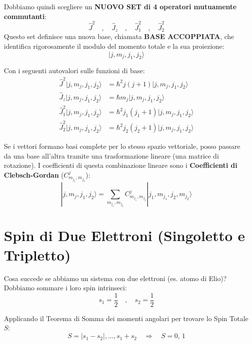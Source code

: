 \documentclass[11pt, a4paper]{article}
\begin{document}
\noindent
Dobbiamo quindi scegliere un \textbf{NUOVO SET di 4 operatori mutuamente commutanti}: %
\begin{equation*}
    \hat{J}^2 \quad , \quad \hat{J}_z \quad , \quad \hat{J}_1^2 \quad , \quad \hat{J}_2^2 %
\end{equation*}
Questo set definisce una nuova base, chiamata \textbf{BASE ACCOPPIATA}, che identifica rigorosamente il modulo del momento totale e la sua proiezione: %
\begin{equation}
    \boxed{ |j, m_j, j_1, j_2\rangle } %
\end{equation}

Con i seguenti autovalori sulle funzioni di base: %
\begin{align*}
    \hat{J}^2 |j, m_j, j_1, j_2\rangle &= \hbar^2 j(j+1) |j, m_j, j_1, j_2\rangle \\ %
    \hat{J}_z |j, m_j, j_1, j_2\rangle &= \hbar m_j |j, m_j, j_1, j_2\rangle \\ %
    \hat{J}_1^2 |j, m_j, j_1, j_2\rangle &= \hbar^2 j_1(j_1+1) |j, m_j, j_1, j_2\rangle \\ %
    \hat{J}_2^2 |j, m_j, j_1, j_2\rangle &= \hbar^2 j_2(j_2+1) |j, m_j, j_1, j_2\rangle %
\end{align*}

\noindent
Se i vettori formano basi complete per lo stesso spazio vettoriale, posso passare da una base all'altra tramite una trasformazione lineare (una matrice di rotazione). I coefficienti di questa combinazione lineare sono i \textbf{Coefficienti di Clebsch-Gordan} ($C_{m_{j_1}, m_{j_2}}^j$): %
\begin{equation}
    |j, m_j, j_1, j_2\rangle = \sum_{m_{j_1}, m_{j_2}} C_{m_{j_1}, m_{j_2}}^j |j_1, m_{j_1}, j_2, m_{j_2}\rangle %
\end{equation}

\section{Spin di Due Elettroni (Singoletto e Tripletto)} %

Cosa succede se abbiamo un sistema con due elettroni (es. atomo di Elio)? Dobbiamo sommare i loro spin intrinseci: %
\begin{equation*}
    s_1 = \frac{1}{2} \quad , \quad s_2 = \frac{1}{2} %
\end{equation*}

Applicando il Teorema di Somma dei momenti angolari per trovare lo Spin Totale $S$: %
\begin{equation*}
    S = |s_1 - s_2|, \dots , s_1 + s_2 \quad \Rightarrow \quad S = 0, \, 1 %
\end{equation*}
\end{document}
